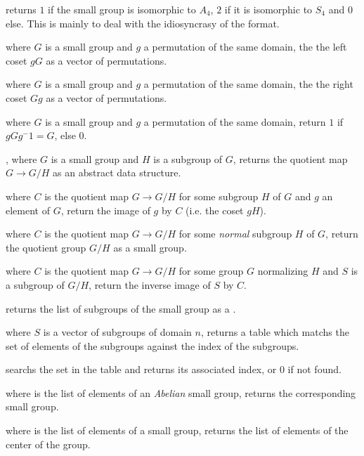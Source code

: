  returns $1$ if the small group
 is isomorphic to $A_4$, $2$ if it is isomorphic to $S_4$ and
$0$ else. This is mainly to deal with the idiosyncrasy of the format.

 where $G$ is a small group and $g$ a
permutation of the same domain, the the left coset $gG$ as a vector of
permutations.

 where $G$ is a small group and $g$ a
permutation of the same domain, the the right coset $Gg$  as a vector of permutations.

 where $G$ is a small group and
$g$ a permutation of the same domain, return $1$ if $gGg^-1=G$, else $0$.

, where $G$ is a small group and
$H$ is a subgroup of $G$, returns the quotient map $G\rightarrow G/H$
as an abstract data structure.

 where $C$ is the quotient map
$G\rightarrow G/H$ for some subgroup $H$ of $G$ and $g$ an element of $G$,
return the image of $g$ by $C$ (i.e. the coset $gH$).

 where $C$ is the quotient map
$G\rightarrow G/H$ for some \emph{normal} subgroup $H$ of $G$, return the
quotient group $G/H$ as a small group.

 where $C$ is the
quotient map $G\rightarrow G/H$ for some group $G$ normalizing $H$ and $S$ is
a subgroup of $G/H$, return the inverse image of $S$ by $C$.

 returns the list of subgroups of the
small group  as a .

 where $S$ is a vector of subgroups
of domain $n$, returns a table which matchs the set of elements of the
subgroups against the index of the subgroups.

 searchs the set  in
the table  and returns its associated index, or $0$ if not found.

 where  is the list of
elements of an \emph{Abelian} small group, returns the corresponding
small group.

 where  is the list of elements
of a small group, returns the list of elements of the center of the
group.

